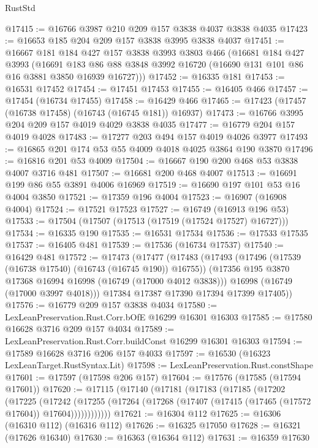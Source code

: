 \begin{lexlean}{RustStd}
\begin{coremodule}
@17415 := @16766 @3987 @210 @209 @157 @3838 @4037 @3838 @4035
@17423 := @16653 @185 @204 @209 @157 @3838 @3995 @3838 @4037
@17451 := @16667
    @181
    @184
    @427
    @157
    @3838
    @3993
    @3803
    @466
    (@16681
      @184
      @427
      @3993
      (@16691 @183 @86 @88 @3848 @3992 @16720 (@16690 @131 @101 @86 @16 @3881 @3850 @16939 @16727)))
@17452 := @16335 @181
@17453 := @16531 @17452
@17454 := @17451 @17453
@17455 := @16405 @466
@17457 := @17454 (@16734 @17455)
@17458 := @16429 @466
@17465 := @17423 (@17457 (@16738 @17458) (@16743 (@16745 @181)) @16937)
@17473 := @16766 @3995 @204 @209 @157 @4019 @4029 @3838 @4035
@17477 := @16779 @204 @157 @4019 @4028
@17483 := @17277 @203 @494 @157 @4019 @4026 @3977
@17493 := @16865 @201 @174 @53 @55 @4009 @4018 @4025 @3864 @190 @3870
@17496 := @16816 @201 @53 @4009
@17504 := @16667 @190 @200 @468 @53 @3838 @4007 @3716 @481
@17507 := @16681 @200 @468 @4007
@17513 := @16691 @199 @86 @55 @3891 @4006 @16969
@17519 := @16690 @197 @101 @53 @16 @4004 @3850
@17521 := @17359 @196 @4004
@17523 := @16907 (@16908 @4004)
@17524 := @17521 @17523
@17527 := @16749 (@16913 @196 @53)
@17533 := @17504 (@17507 (@17513 (@17519 (@17524 @17527) @16727)))
@17534 := @16335 @190
@17535 := @16531 @17534
@17536 := @17533 @17535
@17537 := @16405 @481
@17539 := @17536 (@16734 @17537)
@17540 := @16429 @481
@17572 := @17473
    (@17477
      (@17483
        (@17493
          (@17496 (@17539 (@16738 @17540) (@16743 (@16745 @190)) @16755))
          (@17356 @195 @3870 @17368 @16994 @16998 (@16749 (@17000 @4012 @3838)))
          @16998
          (@16749 (@17000 @3997 @4018)))
        @17384
        @17387
        @17390
        @17394
        @17399
        @17405))
@17576 := @16779 @209 @157 @3838 @4034
@17580 := LexLeanPreservation.Rust.Corr.bOfE @16299 @16301 @16303
@17585 := @17580 @16628 @3716 @209 @157 @4034
@17589 := LexLeanPreservation.Rust.Corr.buildConst @16299 @16301 @16303
@17594 := @17589 @16628 @3716 @206 @157 @4033
@17597 := @16530 (@16323 LexLeanTarget.RustSyntax.Lit)
@17598 := LexLeanPreservation.Rust.constShape
@17601 := @17597 (@17598 @206 @157)
@17604 := @17576 (@17585 (@17594 @17601))
@17620 := @17115
    (@17140
      (@17181
        (@17183
          (@17185
            (@17202
              (@17225
                (@17242
                  (@17255
                    (@17264 (@17268 (@17407 (@17415 (@17465 (@17572 @17604)) @17604))))))))))))
@17621 := @16304 @112
@17625 := @16306 (@16310 @112) (@16316 @112)
@17626 := @16325 @17050
@17628 := @16321 (@17626 @16340)
@17630 := @16363 (@16364 @112)
@17631 := @16359 @17630

\end{coremodule}
\end{lexlean}

